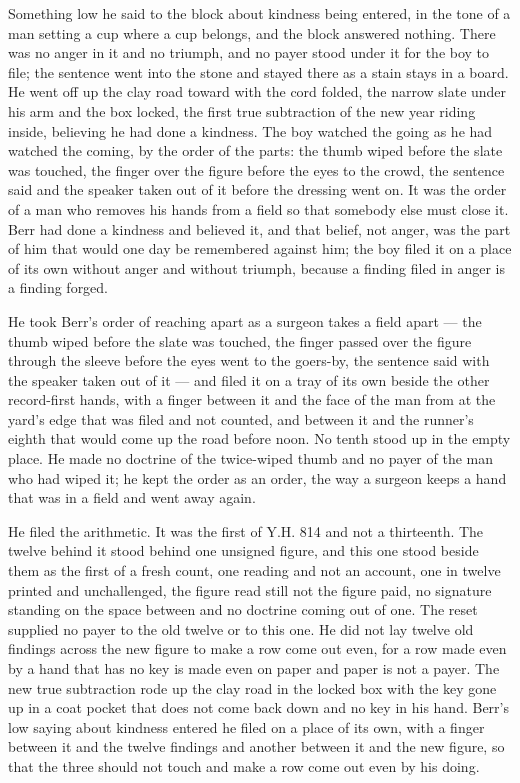 Something low he said to the block about kindness being entered, in the tone of a man setting a cup where a cup belongs, and the block answered nothing. There was no anger in it and no triumph, and no payer stood under it for the boy to file; the sentence went into the stone and stayed there as a stain stays in a board. He went off up the clay road toward  with the cord folded, the narrow slate under his arm and the box locked, the first true subtraction of the new year riding inside, believing he had done a kindness. The boy watched the going as he had watched the coming, by the order of the parts: the thumb wiped before the slate was touched, the finger over the figure before the eyes to the crowd, the sentence said and the speaker taken out of it before the dressing went on. It was the order of a man who removes his hands from a field so that somebody else must close it. Berr had done a kindness and believed it, and that belief, not anger, was the part of him that would one day be remembered against him; the boy filed it on a place of its own without anger and without triumph, because a finding filed in anger is a finding forged.

He took Berr's order of reaching apart as a surgeon takes a field apart --- the thumb wiped before the slate was touched, the finger passed over the figure through the sleeve before the eyes went to the goers-by, the sentence said with the speaker taken out of it --- and filed it on a tray of its own beside the other record-first hands, with a finger between it and the face of the man from  at the yard's edge that was filed and not counted, and between it and the runner's eighth that would come up the road before noon. No tenth stood up in the empty place. He made no doctrine of the twice-wiped thumb and no payer of the man who had wiped it; he kept the order as an order, the way a surgeon keeps a hand that was in a field and went away again.

He filed the arithmetic. It was the first of Y.H. 814 and not a thirteenth. The twelve behind it stood behind one unsigned figure, and this one stood beside them as the first of a fresh count, one reading and not an account, one in twelve printed and unchallenged, the figure read still not the figure paid, no signature standing on the space between and no doctrine coming out of one. The reset supplied no payer to the old twelve or to this one. He did not lay twelve old findings across the new figure to make a row come out even, for a row made even by a hand that has no key is made even on paper and paper is not a payer. The new true subtraction rode up the clay road in the locked box with the key gone up in a coat pocket that does not come back down and no key in his hand. Berr's low saying about kindness entered he filed on a place of its own, with a finger between it and the twelve findings and another between it and the new figure, so that the three should not touch and make a row come out even by his doing.


